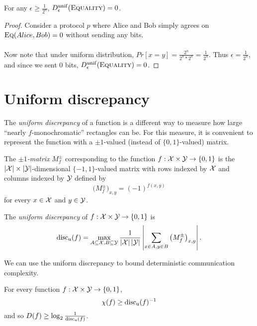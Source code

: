 \begin{theorem}
	For any $\epsilon \ge \frac1{2^n}$, $D_\epsilon^{\mathrm{unif}}(\textsc{Equality}) = 0$.
\end{theorem}

\begin{proof}
	Consider a protocol $p$ where Alice and Bob simply agrees on $\textsc{Eq} (Alice,Bob) = 0$ without sending any bits. \\
	\\
	Now note that under uniform distribution, $Pr[x=y] = \frac{2^n}{2^n*2^n} = \frac{1}{2^n}$. Thus $\epsilon = \frac{1}{2^n}$, and since we sent 0 bits, $D_\epsilon^{\mathrm{unif}}(\textsc{Equality}) = 0$.
\end{proof}


\section{Uniform discrepancy}

The \emph{uniform discrepancy} of a function is a different way to measure how large ``nearly $f$-monochromatic'' rectangles can be. For this measure, it is convenient to represent the function with a $\pm1$-valued (instead of $\{0,1\}$-valued) matrix.

\begin{definition}
	The \emph{$\pm 1$-matrix} $M^\pm_f$ corresponding to the function $f : \mathcal{X} \times \mathcal{Y} \to \{0,1\}$ is the $|\mathcal{X}| \times |\mathcal{Y}|$-dimensional $\{-1,1\}$-valued matrix with rows indexed by $\mathcal{X}$ and columns indexed by $\mathcal{Y}$ defined by
	\[
	\big(M^{\pm}_f\big)_{x,y} = (-1)^{f(x,y)}
	\]
	for every $x \in \mathcal{X}$ and $y \in \mathcal{Y}$.
\end{definition}

\begin{definition}
	The \emph{uniform discrepancy} of $f : \mathcal{X} \times \mathcal{Y} \to \{0,1\}$ is
	\[
	\mathrm{disc_u}(f) = \max_{A \subseteq \mathcal{X}, B \subseteq \mathcal{Y}} \frac{1}{|\mathcal{X}| \, |\mathcal{Y}|} \left| \sum_{x \in A, y \in B} \big(M^{\pm}_f\big)_{x,y} \right|.
	\]
\end{definition}

We can use the uniform discrepancy to bound deterministic communication complexity.

\begin{theorem}
	For every function $f : \mathcal{X} \times \mathcal{Y} \to \{0,1\}$,
	\[
	\chi(f) \ge \mathrm{disc_u}(f)^{-1}
	\] 
	and so $D(f) \ge \log_2 \frac1{\mathrm{disc_u}(f)}$.
\end{theorem}

